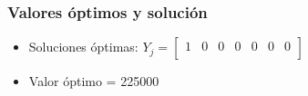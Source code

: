 \documentclass[a4paper,12pt]{article}
\begin{document}
\subsubsection{Valores óptimos y solución}
\begin{itemize}
	\item Soluciones óptimas:
	$Y_{j}=
	\begin{bmatrix}
	1 & 0 & 0 & 0 & 0 & 0 & 0\\
	\end{bmatrix}$
	\item Valor óptimo = 225000
\end{itemize}
\end{document}
